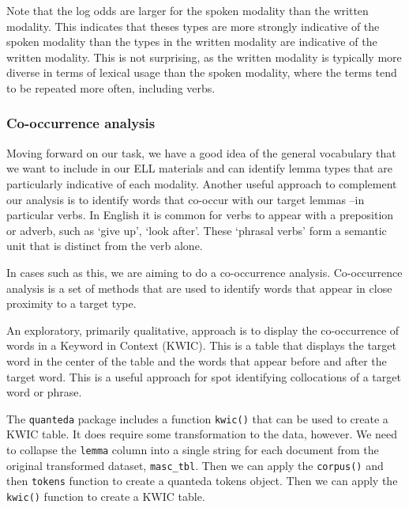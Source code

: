 \documentclass[
  letterpaper,
  DIV=11,
  numbers=noendperiod]{scrreport}
\theoremstyle{definition}
\theoremstyle{remark}
\begin{document}
Note that the log odds are larger for the spoken modality than the
written modality. This indicates that theses types are more strongly
indicative of the spoken modality than the types in the written modality
are indicative of the written modality. This is not surprising, as the
written modality is typically more diverse in terms of lexical usage
than the spoken modality, where the terms tend to be repeated more
often, including verbs.

\hypertarget{sec-eda-co-occurrence}{%
\subsubsection{Co-occurrence analysis}\label{sec-eda-co-occurrence}}

Moving forward on our task, we have a good idea of the general
vocabulary that we want to include in our ELL materials and can identify
lemma types that are particularly indicative of each modality. Another
useful approach to complement our analysis is to identify words that
co-occur with our target lemmas --in particular verbs. In English it is
common for verbs to appear with a preposition or adverb, such as `give
up', `look after'. These `phrasal verbs' form a semantic unit that is
distinct from the verb alone.

In cases such as this, we are aiming to do a co-occurrence analysis.
Co-occurrence analysis is a set of methods that are used to identify
words that appear in close proximity to a target type.

An exploratory, primarily qualitative, approach is to display the
co-occurrence of words in a Keyword in Context (KWIC). This is a table
that displays the target word in the center of the table and the words
that appear before and after the target word. This is a useful approach
for spot identifying collocations of a target word or phrase.

The \texttt{quanteda} package includes a function \texttt{kwic()} that
can be used to create a KWIC table. It does require some transformation
to the data, however. We need to collapse the \texttt{lemma} column into
a single string for each document from the original transformed dataset,
\texttt{masc\_tbl}. Then we can apply the \texttt{corpus()} and then
\texttt{tokens} function to create a quanteda tokens object. Then we can
apply the \texttt{kwic()} function to create a KWIC table.
\end{document}
